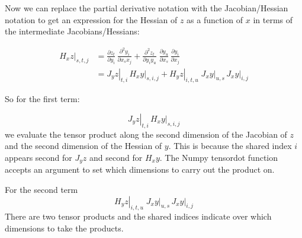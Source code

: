 \documentclass[11pt]{amsart}
\begin{document}
Now we can replace the partial derivative notation with the Jacobian/Hessian notation to get an expression for the Hessian of $z$ as a function of $x$ in terms of the intermediate Jacobians/Hessians:


$$
\begin{aligned}
\left.
H_{x} z \right\vert_{s,t,j} 
&= 
\frac{\partial z_{t}}{\partial y_{i}}
\,
\frac{\partial^{2} y_{i}}{\partial x_{s} x_{j}}
+
\frac{\partial^{2} z_{t}}{\partial y_{i} y_{u}}
\;
\frac{\partial y_{u}}{\partial x_{s}}
\,
\frac{\partial y_{i}}{\partial x_{j}}
\\
&= 
\left.
J_{y} z \right|_{t,i}
\,
\left.
H_{x} y \right|_{s,i,j}
+
\left.
H_{y} z \right|_{i,t,u}
\;
\left.
J_{x} y \right|_{{u,s}}
\,
\left.
J_{x} y \right|_{i,j}
\end{aligned}
$$

So for the first term:

$$
\left.
J_{y} z \right|_{t,i}
\,
\left.
H_{x} y \right|_{s,i,j}
$$
we evaluate the tensor product along the second dimension of the Jacobian of $z$ and the second dimension of the Hessian of $y$. This is because the shared index $i$ appears second for $J_{y} z$ and second for $H_{x} y$. The Numpy tensordot function accepts an argument to set which dimensions to carry out the product on.

For the second term
$$
\left.
H_{y} z \right|_{i,t,u}
\;
\left.
J_{x} y \right|_{{u,s}}
\,
\left.
J_{x} y \right|_{i,j}
$$
There are two tensor products and the shared indices indicate over which dimensions to take the products.
\end{document}

